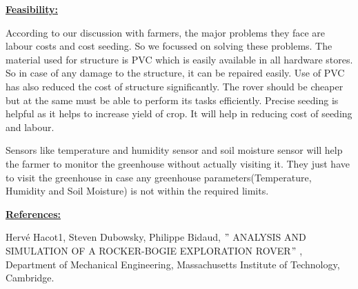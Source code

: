 \documentclass[12pt]{article}
\begin{document}
\vspace{\baselineskip}
\setlength{\parskip}{8.04pt}
\begin{adjustwidth}{0.5in}{0.52in}
{\fontsize{14pt}{16.8pt}\selectfont \textbf{\uline{Feasibility:}}\par}\par

\end{adjustwidth}

\begin{adjustwidth}{0.5in}{0.52in}
According to our discussion with farmers, the major problems they face are labour costs and cost seeding. So we focussed on solving these problems. The material used for structure is PVC which is easily available in all hardware stores. So in case of any damage to the structure, it can be repaired easily. Use of PVC has also reduced the cost of structure significantly. The rover should be cheaper but at the same must be able to perform its tasks efficiently. Precise seeding is helpful as it helps to increase yield of crop. It will help in reducing cost of seeding and labour.\par

\end{adjustwidth}

\begin{adjustwidth}{0.5in}{0.52in}
Sensors like temperature and humidity sensor and soil moisture sensor will help the farmer to monitor the greenhouse without actually visiting it. They just have to visit the greenhouse in case any greenhouse parameters(Temperature, Humidity and Soil Moisture) is not within the required limits.\par

\end{adjustwidth}

\begin{adjustwidth}{0.5in}{0.52in}
{\fontsize{14pt}{16.8pt}\selectfont \textbf{\uline{References:}}\par}\par

\end{adjustwidth}

\begin{adjustwidth}{0.5in}{0.52in}
\begin{justify}
 [1] Hervé Hacot1, Steven Dubowsky, Philippe Bidaud, \textcolor[HTML]{00796B}{$"$ }ANALYSIS AND SIMULATION OF A ROCKER-BOGIE EXPLORATION ROVER\textcolor[HTML]{00796B}{$"$ }, Department of Mechanical Engineering, Massachusetts Institute of Technology, Cambridge.
\end{justify}\par

\end{adjustwidth}
\end{document}
